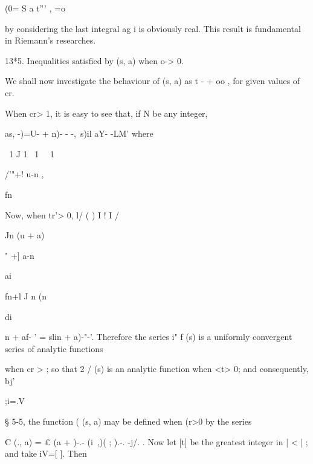  (0= S a t''' , =o

by considering the last integral ag i is obviously real. This result
is fundamental in Riemann's researches.

13*5. Inequalities satisfied by (s, a) when o-> 0.

We shall now investigate the behaviour of (s, a) as t - + oo , for
given values of cr.

When cr> 1, it is easy to see that, if N be any integer,

as, -)=U- + n)- - -,\ s)il aY- -LM' where

\ 1 J 1 \ 1 \ \ 1

/'"+! u-n ,

fn

Now, when tr'> 0, l/ ( ) I ! I /

Jn (u + a)

" +] a-n

ai

fn+l J n (n

di

 n + af- ' = slin + a)-"-'. Therefore the series i" f (s) is a
uniformly convergent series of analytic functions

when cr > ; so that 2 / (s) is an analytic function when <t> 0; and
consequently, bj'

;i=.V

§ 5-5, the function ( (s, a) may be defined when (r>0 by the series

C (., a) = £ (a + )-.- (i\ ,)( ; ).-. -j/. . Now let [t] be the
greatest integer in | < | ; and take iV=[ ]. Then

